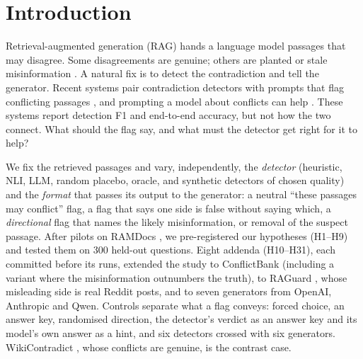 \section{Introduction}

Retrieval-augmented generation (RAG) \citep{lewis2020rag} hands a language model passages that may disagree. Some
disagreements are genuine; others are planted or stale misinformation \citep{zou2025poisonedrag,wang2025madam}. A natural fix is to detect the contradiction and tell
the generator. Recent systems pair contradiction detectors with prompts that flag conflicting passages
\citep{wang2026conflictrag}, and prompting a model about conflicts can help \citep{cattan2025conflicts}. These systems
report detection F1 and end-to-end accuracy, but not how the two connect. What should the flag say, and what must the
detector get right for it to help?

We fix the retrieved passages and vary, independently, the \emph{detector} (heuristic, NLI, LLM, random placebo,
oracle, and synthetic detectors of chosen quality) and the \emph{format} that passes its output to the generator: a
neutral ``these passages may conflict'' flag, a flag that says one side is false without saying which, a
\emph{directional} flag that names the likely misinformation, or removal of the suspect passage. After pilots on
RAMDocs \citep{wang2025madam}, we pre-registered our hypotheses (H1--H9) and tested them on 300 held-out questions.
Eight addenda (H10--H31), each committed before its runs, extended the study to ConflictBank \citep{su2024conflictbank}
(including a variant where the misinformation outnumbers the truth), to RAGuard \citep{zeng2025raguard}, whose
misleading side is real Reddit posts, and to seven generators from OpenAI, Anthropic and Qwen. Controls separate what a
flag conveys: forced choice, an answer key, randomised direction, the detector's verdict as an answer key and its model's own answer as
a hint, and six detectors crossed with six generators. WikiContradict \citep{hou2024wikicontradict}, whose conflicts are genuine, is the contrast case.

